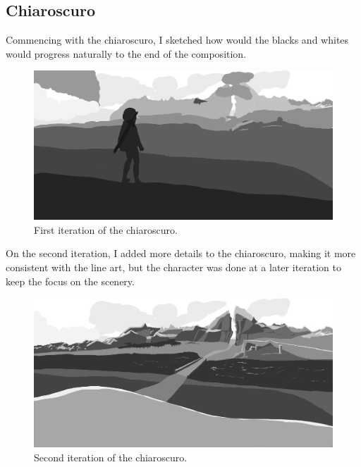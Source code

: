 \documentclass{cup-pan}
\begin{document}
    \subsection{Chiaroscuro}
        Commencing with the chiaroscuro, I sketched how would the blacks and whites would progress naturally to the end of the composition.
        \begin{figure}[H]
            \includegraphics[width=\textwidth]{Imagenes/Fanart1/Claroscuro/Imagen1.png}
            \caption{First iteration of the chiaroscuro.}
        \end{figure}

        On the second iteration, I added more details to the chiaroscuro, making it more consistent with the line art, but the character was done at a later iteration to keep the focus on the scenery.\\
        \begin{figure}[H]
            \includegraphics[width=\textwidth]{Imagenes/Fanart1/Claroscuro/Imagen2.png}
            \caption{Second iteration of the chiaroscuro.}
        \end{figure}
\end{document}
